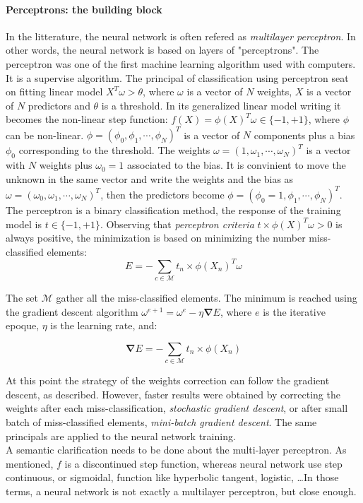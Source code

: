 \documentclass[final, paper=letter,5p,times,twocolumn]{elsarticle}
\begin{document}
\paragraph{Perceptrons: the building block}{In the litterature, the neural network is often refered as {\it multilayer perceptron}. In other words, the neural network is based on layers of "perceptrons". The perceptron was one of the first machine learning algorithm used with computers. It is a supervise algorithm. The principal of classification using perceptron seat on fitting linear model $X^{T}\omega > \theta$, where $\omega$ is a vector of $N$ weights, $X$ is a vector of $N$ predictors and $\theta$ is a threshold. In its generalized linear model writing it becomes the non-linear step function: $f(X) = \phi(X)^{T}\omega \in \{-1,+1\}$, where $\phi$ can be non-linear. $\phi = (\phi_{0}, \phi_{1}, \cdots, \phi_{N})^{T}$ is a vector of $N$ components plus a bias $\phi_{0}$ corresponding to the threshold. The weights $\omega = (1, \omega_{1}, \cdots, \omega_{N})^{T}$ is a vector with $N$ weights plus $\omega_{0} = 1$ associated to the bias. It is convinient to move the unknown in the same vector and write the weights and the bias as $\omega = (\omega_{0}, \omega_{1}, \cdots, \omega_{N})^{T}$, then the predictors become $\phi = (\phi_{0} = 1, \phi_{1}, \cdots, \phi_{N})^{T}$. The perceptron is a binary classification method, the response of the training model is $t \in \{-1,+1\}$. Observing that {\it perceptron criteria} $t \times \phi(X)^{T}\omega > 0$ is always positive, the minimization is based on minimizing the number miss-classified elements: \\

\begin{equation}
E = - \sum_{c \in \mathcal{M}} t_{n} \times \phi(X_{n})^{T}\omega
\label{eq:Optimization_perceptron}
\end{equation}

The set $\mathcal{M}$ gather all the miss-classified elements. The minimum is reached using the gradient descent algorithm $\omega^{e+1} = \omega^{e} - \eta \bm{\nabla} E$, where $e$ is the iterative epoque, $\eta$ is the learning rate, and:

$$
\bm{\nabla} E = - \sum_{c \in \mathcal{M}} t_{n} \times \phi(X_{n})
$$

At this point the strategy of the weights correction can follow the gradient descent, as described. However, faster results were obtained by correcting the weights after each miss-classification, {\it stochastic gradient descent}, or after small batch of miss-classified elements, {\it mini-batch gradient descent}. The same principals are applied to the neural network training.\\
A semantic clarification needs to be done about the multi-layer perceptron. As mentioned, $f$ is a discontinued step function, whereas neural network use step continuous, or sigmoidal, function like hyperbolic tangent, logistic, \dots In those terms, a neural network is not exactly a multilayer perceptron, but close enough.}
\end{document}
